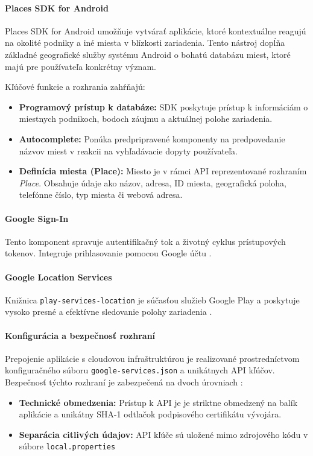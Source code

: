 \paragraph{Places SDK for Android}
Places SDK for Android umožňuje vytvárať aplikácie, ktoré kontextuálne reagujú na okolité podniky a iné miesta v blízkosti zariadenia. 
Tento nástroj dopĺňa základné geografické služby systému Android o bohatú databázu miest, ktoré majú pre používateľa konkrétny význam.

Kľúčové funkcie a rozhrania zahŕňajú:
\begin{itemize}[noitemsep, topsep=0pt]
    \item \textbf{Programový prístup k databáze:} SDK poskytuje prístup k informáciám o miestnych podnikoch, bodoch záujmu a aktuálnej polohe zariadenia.
    \item \textbf{Autocomplete:} Ponúka predpripravené komponenty  na predpovedanie názvov miest v reakcii na vyhľadávacie dopyty používateľa.
    \item \textbf{Definícia miesta (Place):} Miesto je v rámci API reprezentované rozhraním
     \textit{Place}. Obsahuje údaje ako názov, adresa, ID miesta, geografická poloha, telefónne číslo, typ miesta či webová adresa.
\end{itemize}
\cite{google_places_sdk}

\paragraph{Google Sign-In}
Tento komponent spravuje autentifikačný tok  a životný cyklus prístupových tokenov. Integruje prihlasovanie pomocou Google účtu  \cite{google_signin}.


\paragraph{Google Location Services}
Knižnica \texttt{play-services-location} je súčasťou služieb Google Play a poskytuje vysoko presné a efektívne sledovanie polohy zariadenia \cite{google_location_android}
                                       .

\paragraph{Konfigurácia a bezpečnosť rozhraní}
Prepojenie aplikácie s cloudovou infraštruktúrou je realizované prostredníctvom konfiguračného súboru 
\texttt{google-services.json} a unikátnych API kľúčov. Bezpečnosť týchto rozhraní je zabezpečená na dvoch úrovniach \cite{cloudinary_blog}:
\begin{itemize}[noitemsep, topsep=0pt]
    \item \textbf{Technické obmedzenia:} Prístup k API je je striktne obmedzený na balík aplikácie
     a unikátny SHA-1 odtlačok podpisového certifikátu vývojára.
    \item \textbf{Separácia citlivých údajov:} API kľúče sú uložené mimo zdrojového kódu v 
    súbore \texttt{local.properties}
\end{itemize}

